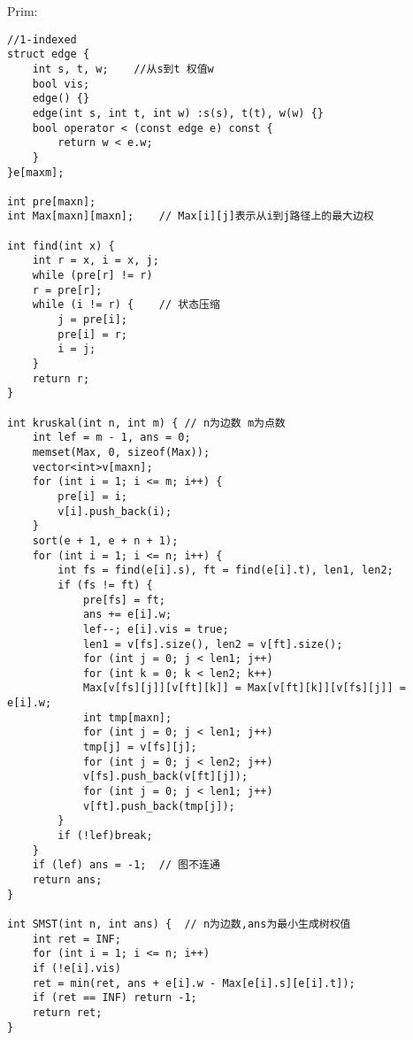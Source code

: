 Prim:
\begin{lstlisting}
//1-indexed
struct edge {
	int s, t, w;	//从s到t 权值w
	bool vis;
	edge() {}
	edge(int s, int t, int w) :s(s), t(t), w(w) {}
	bool operator < (const edge e) const {
		return w < e.w;
	}
}e[maxm];

int pre[maxn];
int Max[maxn][maxn];	// Max[i][j]表示从i到j路径上的最大边权

int find(int x) {
	int r = x, i = x, j;
	while (pre[r] != r)
	r = pre[r];
	while (i != r) {	// 状态压缩
		j = pre[i];
		pre[i] = r;
		i = j;
	}
	return r;
}

int kruskal(int n, int m) {	// n为边数 m为点数
	int lef = m - 1, ans = 0;
	memset(Max, 0, sizeof(Max));
	vector<int>v[maxn];
	for (int i = 1; i <= m; i++) {
		pre[i] = i;
		v[i].push_back(i);
	}
	sort(e + 1, e + n + 1);
	for (int i = 1; i <= n; i++) {
		int fs = find(e[i].s), ft = find(e[i].t), len1, len2;
		if (fs != ft) {
			pre[fs] = ft;
			ans += e[i].w;
			lef--; e[i].vis = true;
			len1 = v[fs].size(), len2 = v[ft].size();
			for (int j = 0; j < len1; j++)
			for (int k = 0; k < len2; k++)
			Max[v[fs][j]][v[ft][k]] = Max[v[ft][k]][v[fs][j]] = e[i].w;
			int tmp[maxn];
			for (int j = 0; j < len1; j++)
			tmp[j] = v[fs][j];
			for (int j = 0; j < len2; j++)
			v[fs].push_back(v[ft][j]);
			for (int j = 0; j < len1; j++)
			v[ft].push_back(tmp[j]);
		}
		if (!lef)break;
	}
	if (lef) ans = -1;	// 图不连通
	return ans;
}

int SMST(int n, int ans) {	// n为边数,ans为最小生成树权值
	int ret = INF;
	for (int i = 1; i <= n; i++)
	if (!e[i].vis)
	ret = min(ret, ans + e[i].w - Max[e[i].s][e[i].t]);
	if (ret == INF) return -1;
	return ret;
}
\end{lstlisting}